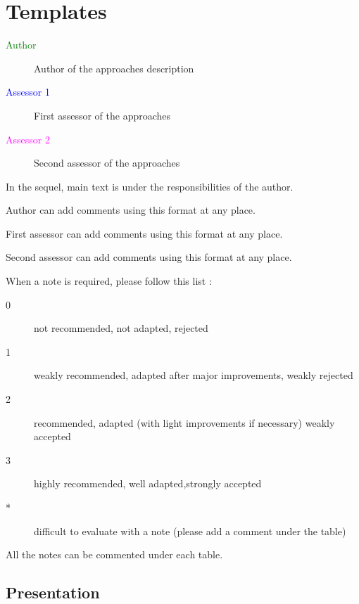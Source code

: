 \chapter{Templates}
\label{sec:templates}

\begin{description}
\item[\textcolor{green}{Author}] Author of the approaches description  
\item[\textcolor{blue}{Assessor 1}] First assessor of the approaches 
\item[\textcolor{magenta}{Assessor 2}] Second assessor of the approaches 
\end{description}

In the sequel, main text is under the responsibilities of the author.

\begin{author_comment}
Author can add comments using this format at any place.
\end{author_comment}

\begin{assessor1}
First assessor can add comments using this format at any place.
\end{assessor1}

\begin{assessor2}
Second assessor can add comments using this format at any place.
\end{assessor2}

When a note is required, please follow this list :
\begin{description}
\item[0] not recommended, not adapted, rejected
\item[1] weakly recommended, adapted after major improvements, weakly rejected
\item[2] recommended, adapted (with light improvements if necessary)  weakly accepted
\item[3] highly recommended, well adapted,strongly accepted
\item[*] difficult to evaluate with a note (please add a comment under the table)
\end{description}

All the notes can be commented under each table.

\section{Presentation}

